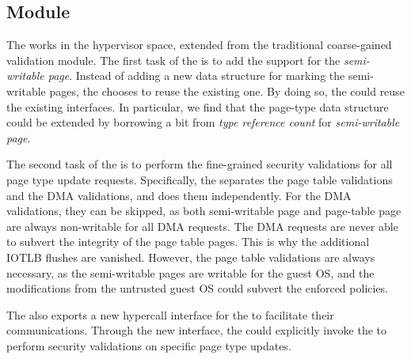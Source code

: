 \subsection{\name Module}\label{sec:module}
The \module works in the hypervisor space, extended from the traditional coarse-gained validation module.
The first task of the \module is to add the support for the \emph{semi-writable page}.
Instead of adding a new data structure for marking the semi-writable pages, the \module chooses to reuse the existing one.
By doing so, the \module could reuse the existing interfaces.
In particular, we find that the page-type data structure could be extended by borrowing a bit from \emph{type reference count} for \emph{semi-writable page}.

The second task of the \module is to perform the fine-grained security validations for all page type update requests.
Specifically, the \module separates the page table validations and the DMA validations, and does them independently.
For the DMA validations, they can be skipped, as both semi-writable page and page-table page are always non-writable for all DMA requests.
The DMA requests are never able to subvert the integrity of the page table pages.
This is why the additional IOTLB flushes are vanished.
However, the page table validations are always necessary, as the semi-writable pages are writable for the guest OS, and the modifications from the untrusted guest OS could subvert the enforced policies.

The \module also exports a new hypercall interface for the \cache to facilitate their communications.
Through the new interface, the \cache could explicitly invoke the \module to perform security validations on specific page type updates.

